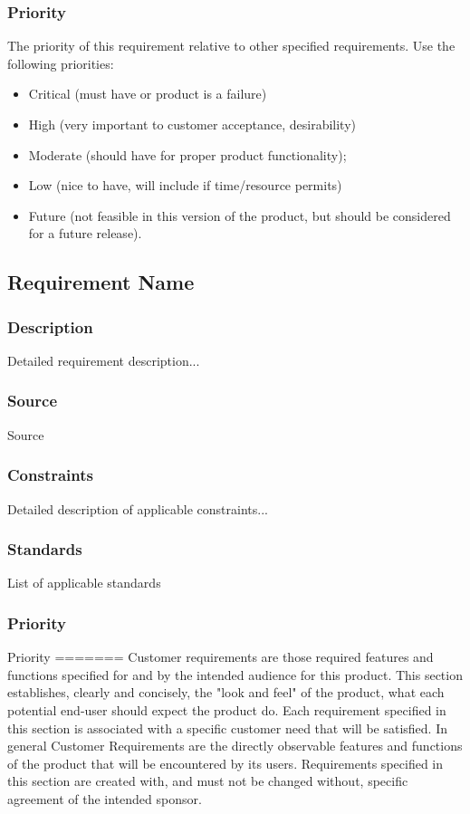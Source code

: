 \subsubsection{Priority}
The priority of this requirement relative to other specified requirements. Use the following priorities:
\begin{itemize}
\item Critical (must have or product is a failure)
\item High (very important to customer acceptance, desirability)
\item Moderate (should have for proper product functionality);
\item Low (nice to have, will include if time/resource permits)
\item Future (not feasible in this version of the product, but should be considered for a future release).
\end{itemize}

\subsection{Requirement Name}
\subsubsection{Description}
Detailed requirement description...
\subsubsection{Source}
Source
\subsubsection{Constraints}
Detailed description of applicable constraints...
\subsubsection{Standards}
List of applicable standards
\subsubsection{Priority}
Priority
=======
Customer requirements are those required features and functions specified for and by the intended audience for this product. This section establishes, clearly and concisely, the "look and feel" of the product, what each potential end-user should expect the product do. Each requirement specified in this section is associated with a specific customer need that will be satisfied. In general Customer Requirements are the directly observable features and functions of the product that will be encountered by its users. Requirements specified in this section are created with, and must not be changed without, specific agreement of the intended sponsor.

